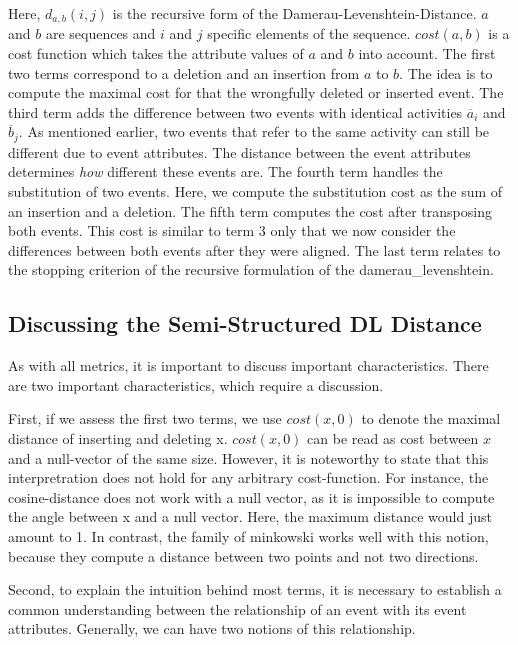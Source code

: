 \documentclass[./../../paper.tex]{subfiles}
\begin{document}
\noindent Here, $d_{a, b}(i, j)$ is the recursive form of the Damerau-Levenshtein-Distance. $a$ and $b$ are sequences and $i$ and $j$ specific elements of the sequence. $cost(a,b)$ is a cost function which takes the attribute values of $a$ and $b$ into account. 
The first two terms correspond to a deletion and an insertion from $a$ to $b$. The idea is to compute the maximal cost for that the wrongfully deleted or inserted event. 
The third term adds the difference between two events with identical activities $\overline{a}_i$ and $\overline{b}_j$. As mentioned earlier, two events that refer to the same activity can still be different due to event attributes. The distance between the event attributes determines \emph{how} different these events are. 
The fourth term handles the substitution of two events. Here, we compute the substitution cost as the sum of an insertion and a deletion. 
The fifth term computes the cost after transposing both events. This cost is similar to term 3 only that we now consider the differences between both events after they were aligned. The last term relates to the stopping criterion of the recursive formulation of the \gls{damerau_levenshtein}.  


\subsection{Discussing the Semi-Structured DL Distance}
As with all metrics, it is important to discuss important characteristics. There are two important characteristics, which require a discussion.

First, if we assess the first two terms, we use $cost(x,0)$ to denote the maximal distance of inserting and deleting x. $cost(x,0)$ can be read as cost between $x$ and a null-vector of the same size. However, it is noteworthy to state that this interpretration does not hold for any arbitrary cost-function. For instance, the cosine-distance does not work with a null vector, as it is impossible to compute the angle between x and a null vector. Here, the maximum distance would just amount to 1. In contrast, the family of \Gls{minkowski} works well with this notion, because they compute a distance between two points and not two directions. 

Second, to explain the intuition behind most terms, it is necessary to establish a common understanding between the relationship of an event with its event attributes. Generally, we can have two notions of this relationship. 
\end{document}
